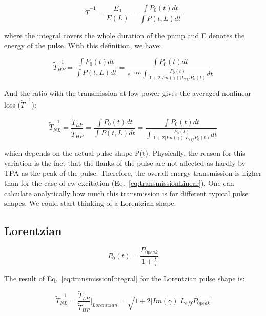 \documentclass[10pt,letterpaper]{article}
\begin{document}
\begin{equation}
 \tilde{T}^{-1} = \frac{E_0}{E(L)} = \frac{\int P_0(t)dt}{\int P(t,L)dt}
\end{equation}

where the integral covers the whole duration of the pump and E denotes the energy of the pulse.
With this definition, we have:


\begin{equation}
 \tilde{T}_{HP}^{-1}  = \frac{\int P_0(t)dt}{\int P(t,L)dt} = \frac{\int P_0(t)dt} {e^{-\alpha L} \int \frac{P_0(t)}{1+2|Im(\gamma)| L_{eff} P_0(t)} dt}
\end{equation}


And the ratio with the transmission at low power gives the averaged nonlinear loss ($\tilde{T}^{-1}$):

\begin{equation}
 \tilde{T}^{-1}_{NL}  = \frac{\tilde{T}_{LP}}{\tilde{T}_{HP}} = \frac{\int P_0(t)dt}{\int P(t,L)dt} = \frac{\int P_0(t)dt}{\int \frac{P_0(t)}{1+2|Im(\gamma)| L_{eff} P_0(t)} dt}
\label{eq:transmissionIntegral}
\end{equation}


which depends on the actual pulse shape P(t).
Physically, the reason for this variation is the fact that the flanks of the pulse are not affected as hardly by TPA as the peak of the pulse. Therefore, the overall energy transmission is higher than for the case of cw excitation (Eq.~\ref{eq:transmissionLinear}). One can calculate analytically how much this transmission is for different typical pulse shapes. We could start thinking of a Lorentzian shape:

\subsection{Lorentzian}

\begin{equation}
 P_0(t) = \frac{P_{0 peak}}{1+\frac{t}{\tau}}
\end{equation}


The result of Eq.~\ref{eq:transmissionIntegral} for the Lorentzian pulse shape is:

\begin{equation}
 \tilde{T}^{-1}_{NL}   = \frac{\tilde{T}_{LP}}{\tilde{T}_{HP}} \bigg|_{Lorentzian}  = \sqrt{1+2|Im(\gamma)| L_{eff} P_{0 peak}}
\label{eq:transmissionLorentzian}
\end{equation}
\end{document}
